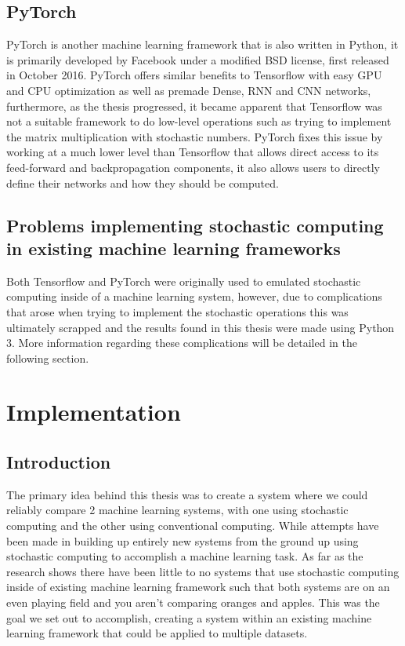\documentclass[a4paper,oneside,phd,etd]{BYUPhys}
\begin{document}
\section{PyTorch}
PyTorch\cite{pytorch} is another machine learning framework that is also written in Python, it is primarily developed by Facebook under a modified BSD license, first released in October 2016. PyTorch offers similar benefits to Tensorflow with easy GPU and CPU optimization as well as premade Dense, RNN and CNN networks, furthermore, as the thesis progressed, it became apparent that Tensorflow was not a suitable framework to do low-level operations such as trying to implement the matrix multiplication with stochastic numbers. PyTorch fixes this issue by working at a much lower level than Tensorflow that allows direct access to its feed-forward and backpropagation components, it also allows users to directly define their networks and how they should be computed.

\section{Problems implementing stochastic computing in existing machine learning frameworks}
Both Tensorflow and PyTorch were originally used to emulated stochastic computing inside of a machine learning system, however, due to complications that arose when trying to implement the stochastic operations this was ultimately scrapped and the results found in this thesis were made using Python 3. More information regarding these complications will be detailed in the following section.

\chapter{Implementation}
\section{Introduction}
The primary idea behind this thesis was to create a system where we could reliably compare 2 machine learning systems, with one using stochastic computing and the other using conventional computing. While attempts have been made in building up entirely new systems from the ground up using stochastic computing to accomplish a machine learning task\cite{hirtzlin2019stochastic}. As far as the research shows there have been little to no systems that use stochastic computing inside of existing machine learning framework such that both systems are on an even playing field and you aren't comparing oranges and apples. This was the goal we set out to accomplish, creating a system within an existing machine learning framework that could be applied to multiple datasets.
\end{document}
